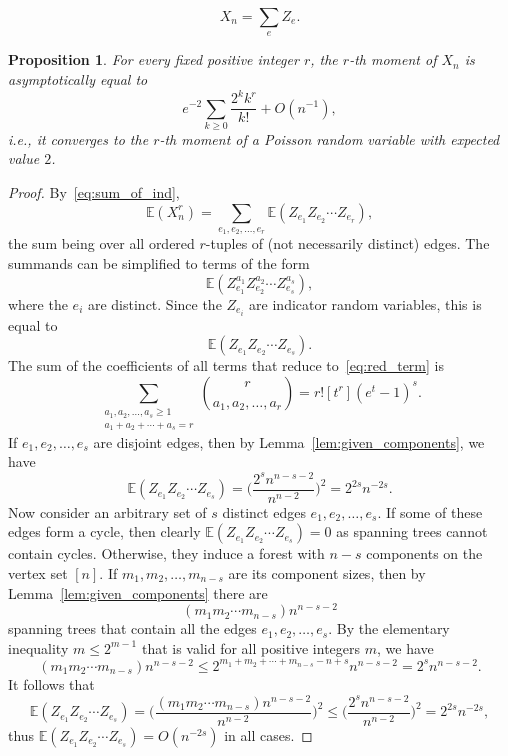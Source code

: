 \documentclass[10pt,a4paper]{amsart}
\newtheorem{proposition}{Proposition}
\newcommand{\Ex}{\mathbb{E}}
\begin{document}
\begin{equation}\label{eq:sum_of_ind}
X_n = \sum_e Z_e.
\end{equation}

\begin{proposition}\label{prop:moments}
For every fixed positive integer $r$, the $r$-th moment of $X_n$ is asymptotically equal to
\[e^{-2} \sum_{k \geq 0} \frac{2^k k^r}{k!} + O(n^{-1}),\]
i.e., it converges to the $r$-th moment of a Poisson random variable with expected value $2$.
\end{proposition}

\begin{proof}
By~\eqref{eq:sum_of_ind},
\[\Ex(X_n^r) = \sum_{e_1,e_2,\ldots,e_r}  \Ex(Z_{e_1}Z_{e_2} \cdots Z_{e_r}),\]
the sum being over all ordered $r$-tuples of (not necessarily distinct) edges. The summands can be simplified to terms of the form
\[\Ex(Z_{e_1}^{a_1} Z_{e_2}^{a_2} \cdots Z_{e_s}^{a_s}),\]
where the $e_i$ are distinct. Since the $Z_{e_i}$ are indicator random variables, this is equal to
\begin{equation}\label{eq:red_term}
\Ex(Z_{e_1}Z_{e_2}\cdots Z_{e_s}).
\end{equation}
The sum of the coefficients of all terms that reduce to~\eqref{eq:red_term} is
\[\sum_{\substack{a_1,a_2,\ldots,a_s \geq 1 \\ a_1 + a_2 + \cdots + a_s = r}} \binom{r}{a_1,a_2,\ldots,a_r}
= r! [t^r] (e^t-1)^s.\]
If $e_1,e_2,\ldots,e_s$ are disjoint edges, then by Lemma~\ref{lem:given_components}, we have
\[\Ex(Z_{e_1}Z_{e_2}\cdots Z_{e_s}) = \Big(\frac{2^s n^{n-s-2}}{n^{n-2}}\Big)^2 = 2^{2s} n^{-2s}.\]
Now consider an arbitrary set of $s$ distinct edges $e_1,e_2,\ldots,e_s$. If some of these edges form a cycle, then clearly $\Ex(Z_{e_1}Z_{e_2}\cdots Z_{e_s}) = 0$ as spanning trees cannot contain cycles. Otherwise, they induce a forest with $n-s$ components on the vertex set $[n]$. If $m_1,m_2,\ldots,m_{n-s}$ are its component sizes, then by Lemma~\ref{lem:given_components} there are
\[(m_1m_2\cdots m_{n-s})n^{n-s-2}\]
spanning trees that contain all the edges $e_1,e_2,\ldots,e_s$. By the elementary inequality $m \leq 2^{m-1}$ that is valid for all positive integers $m$, we have
\[(m_1m_2\cdots m_{n-s})n^{n-s-2} \leq 2^{m_1+m_2+\cdots+m_{n-s}-n+s} n^{n-s-2} = 2^s n^{n-s-2}.\]
It follows that
\[\Ex(Z_{e_1}Z_{e_2}\cdots Z_{e_s}) = 
\Big(\frac{(m_1m_2\cdots m_{n-s})n^{n-s-2}}{n^{n-2}}\Big)^2
\leq \Big(\frac{2^s n^{n-s-2}}{n^{n-2}}\Big)^2 = 2^{2s} n^{-2s},\]
thus $\Ex(Z_{e_1}Z_{e_2}\cdots Z_{e_s}) = O(n^{-2s})$ in all cases.

\end{proof}
\end{document}
